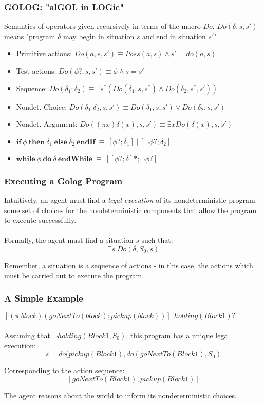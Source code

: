 \documentclass{beamer}
\begin{document}
\begin{frame}
\frametitle{GOLOG: "alGOL in LOGic"}
Semantics of operators given recursively in terms of the macro $Do$.
$Do(\delta,s,s')$ means "program $\delta$ may begin in situation $s$ and end
in situation $s'$"
\begin{itemize}
  \pause
  \item Primitive actions: $Do(a,s,s') \equiv Poss(a,s)\wedge s'=do(a,s)$
  \pause
  \item Test actions: $Do(\phi?,s,s') \equiv \phi \wedge s=s'$
  \pause
  \item Sequence: $Do(\delta_1;\delta_2) \equiv \exists s^* (Do(\delta_1,s,s^*)\wedge Do(\delta_2,s^*,s'))$
  \pause
  \item Nondet. Choice: $Do(\delta_1|\delta_2,s,s') \equiv Do(\delta_1,s,s')\vee Do(\delta_2,s,s')$
  \pause
  \item Nondet. Argument: $Do((\pi x)\delta(x),s,s') \equiv \exists x Do(\delta(x),s,s')$
  \pause
  \item $\mathbf{if}\ \phi\ \mathbf{then}\ \delta_1\ \mathbf{else}\ \delta_2\ \mathbf{endIf}\ \equiv\ [\phi?;\delta_1]\ |\ [\neg\phi?;\delta_2]$
  \pause
  \item $\mathbf{while}\ \phi\ \mathbf{do}\ \delta\ \mathbf{endWhile}\ \equiv\ [[\phi?;\delta]*;\neg\phi?]$
\end{itemize}
\end{frame}

\begin{frame}
\frametitle{Executing a Golog Program}
Intuitively, an agent must find a \emph{legal execution} of its nondeterministic
program - some set of choices for the nondeterministic components that allow
the program to execute successfully.\\
\ \\
Formally, the agent must find a situation $s$ such that:\[
\exists s . Do(\delta,S_0,s)\]


Remember, a situation is a sequence of actions - in this case, the actions which must be carried out to execute the program.
\end{frame}

\begin{frame}
\frametitle{A Simple Example}
$[(\pi\ block)(goNextTo(block);pickup(block))];holding(Block1)?$\\
\ \\
Assuming that $\neg holding(Block1,S_0)$, this program has a unique
legal execution:\[
s = do(pickup(Block1),do(goNextTo(Block1),S_0)\]

Corresponding to the action sequence:\[
[goNextTo(Block1), pickup(Block1)]\]

The agent reasons about the world to inform its nondeterministic choices.
\end{frame}
\end{document}
